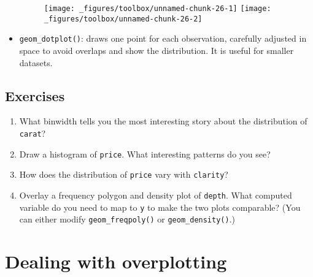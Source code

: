 \begin{itemize}
\begin{Shaded}
\begin{Highlighting}[]
\StringTok{ }
\StringTok{  }\NormalTok{()}
\StringTok{ }
\StringTok{  }\NormalTok{(}\NormalTok{(} \NormalTok{))) +}\StringTok{ }
\StringTok{  }\NormalTok{(}\NormalTok{, }\NormalTok{)}
\end{Highlighting}
\end{Shaded}

  \begin{figure}[H]
    \texttt{[image: \_figures/toolbox/unnamed-chunk-26-1]}%
    \texttt{[image: \_figures/toolbox/unnamed-chunk-26-2]}
  \end{figure}
\item
  \texttt{geom\_dotplot()}: draws one point for each observation,
  carefully adjusted in space to avoid overlaps and show the
  distribution. It is useful for smaller datasets.
   
\end{itemize}

\subsection{Exercises}

\begin{enumerate}
\def\labelenumi{\arabic{enumi}.}
\item
  What binwidth tells you the most interesting story about the
  distribution of \texttt{carat}?
\item
  Draw a histogram of \texttt{price}. What interesting patterns do you
  see?
\item
  How does the distribution of \texttt{price} vary with
  \texttt{clarity}?
\item
  Overlay a frequency polygon and density plot of \texttt{depth}. What
  computed variable do you need to map to \texttt{y} to make the two
  plots comparable? (You can either modify \texttt{geom\_freqpoly()} or
  \texttt{geom\_density()}.)
\end{enumerate}

\hypertarget{sec:overplotting}{\section{Dealing with
overplotting}\label{sec:overplotting}}

